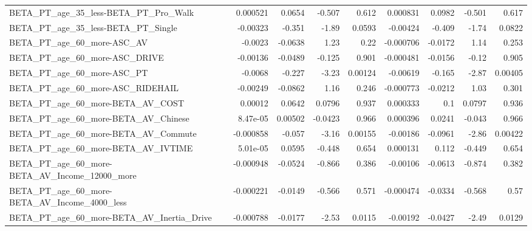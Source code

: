 \begin{tabular}{lrrrrrrrr}
BETA\_PT\_age\_35\_less-BETA\_PT\_Pro\_Walk               &    0.000521 &       0.0654 &   -0.507 &    0.612 &   0.000831 &      0.0982 &       -0.501 &         0.617 \\
BETA\_PT\_age\_35\_less-BETA\_PT\_Single                 &    -0.00323 &       -0.351 &    -1.89 &   0.0593 &   -0.00424 &      -0.409 &        -1.74 &        0.0822 \\
BETA\_PT\_age\_60\_more-ASC\_AV                         &     -0.0023 &      -0.0638 &     1.23 &     0.22 &  -0.000706 &     -0.0172 &         1.14 &         0.253 \\
BETA\_PT\_age\_60\_more-ASC\_DRIVE                      &    -0.00136 &      -0.0489 &   -0.125 &    0.901 &  -0.000481 &     -0.0156 &        -0.12 &         0.905 \\
BETA\_PT\_age\_60\_more-ASC\_PT                         &     -0.0068 &       -0.227 &    -3.23 &  0.00124 &   -0.00619 &      -0.165 &        -2.87 &       0.00405 \\
BETA\_PT\_age\_60\_more-ASC\_RIDEHAIL                   &    -0.00249 &      -0.0862 &     1.16 &    0.246 &  -0.000773 &     -0.0212 &         1.03 &         0.301 \\
BETA\_PT\_age\_60\_more-BETA\_AV\_COST                   &     0.00012 &       0.0642 &   0.0796 &    0.937 &   0.000333 &         0.1 &       0.0797 &         0.936 \\
BETA\_PT\_age\_60\_more-BETA\_AV\_Chinese                &    8.47e-05 &      0.00502 &  -0.0423 &    0.966 &   0.000396 &      0.0241 &       -0.043 &         0.966 \\
BETA\_PT\_age\_60\_more-BETA\_AV\_Commute                &   -0.000858 &       -0.057 &    -3.16 &  0.00155 &   -0.00186 &     -0.0961 &        -2.86 &       0.00422 \\
BETA\_PT\_age\_60\_more-BETA\_AV\_IVTIME                 &    5.01e-05 &       0.0595 &   -0.448 &    0.654 &   0.000131 &       0.112 &       -0.449 &         0.654 \\
BETA\_PT\_age\_60\_more-BETA\_AV\_Income\_12000\_more      &   -0.000948 &      -0.0524 &   -0.866 &    0.386 &   -0.00106 &     -0.0613 &       -0.874 &         0.382 \\
BETA\_PT\_age\_60\_more-BETA\_AV\_Income\_4000\_less       &   -0.000221 &      -0.0149 &   -0.566 &    0.571 &  -0.000474 &     -0.0334 &       -0.568 &          0.57 \\
BETA\_PT\_age\_60\_more-BETA\_AV\_Inertia\_Drive          &   -0.000788 &      -0.0177 &    -2.53 &   0.0115 &   -0.00192 &     -0.0427 &        -2.49 &        0.0129 \\

\end{tabular}

